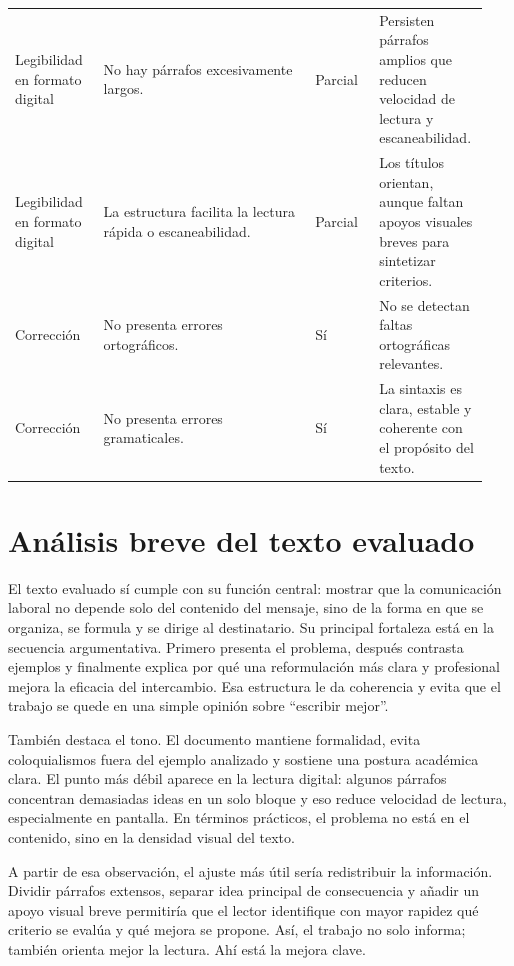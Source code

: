 \documentclass[
	spanish,
	letterpaper, oneside
]{article}
\begin{document}
\begin{longtable}{@{}L{0.18\linewidth}L{0.43\linewidth}L{0.13\linewidth}L{0.20\linewidth}@{}}
Legibilidad en formato digital & No hay párrafos excesivamente largos. & Parcial & Persisten párrafos amplios que reducen velocidad de lectura y escaneabilidad. \\
\addlinespace
Legibilidad en formato digital & La estructura facilita la lectura rápida o escaneabilidad. & Parcial & Los títulos orientan, aunque faltan apoyos visuales breves para sintetizar criterios. \\
\addlinespace
Corrección & No presenta errores ortográficos. & Sí & No se detectan faltas ortográficas relevantes. \\
\addlinespace
Corrección & No presenta errores gramaticales. & Sí & La sintaxis es clara, estable y coherente con el propósito del texto. \\
\bottomrule
\end{longtable}
\endgroup

\section{Análisis breve del texto evaluado}

El texto evaluado sí cumple con su función central: mostrar que la comunicación laboral no depende solo del contenido del mensaje, sino de la forma en que se organiza, se formula y se dirige al destinatario. Su principal fortaleza está en la secuencia argumentativa. Primero presenta el problema, después contrasta ejemplos y finalmente explica por qué una reformulación más clara y profesional mejora la eficacia del intercambio. Esa estructura le da coherencia y evita que el trabajo se quede en una simple opinión sobre ``escribir mejor''.

También destaca el tono. El documento mantiene formalidad, evita coloquialismos fuera del ejemplo analizado y sostiene una postura académica clara. El punto más débil aparece en la lectura digital: algunos párrafos concentran demasiadas ideas en un solo bloque y eso reduce velocidad de lectura, especialmente en pantalla. En términos prácticos, el problema no está en el contenido, sino en la densidad visual del texto.

A partir de esa observación, el ajuste más útil sería redistribuir la información. Dividir párrafos extensos, separar idea principal de consecuencia y añadir un apoyo visual breve permitiría que el lector identifique con mayor rapidez qué criterio se evalúa y qué mejora se propone. Así, el trabajo no solo informa; también orienta mejor la lectura. Ahí está la mejora clave.
\end{document}
